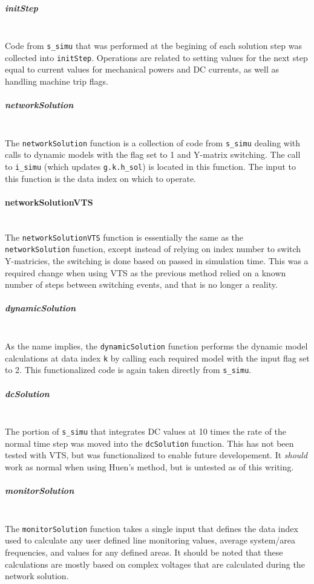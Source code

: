 \documentclass[12pt]{article}
\begin{document}
\subparagraph{initStep} \ \\
Code from \verb|s_simu| that was performed at the begining of each solution step was collected into \verb|initStep|.
Operations are related to setting values for the next step equal to current values for mechanical powers and DC currents, as well as handling machine trip flags.


\subparagraph{networkSolution} \ \\
The \verb|networkSolution| function is a collection of code from \verb|s_simu| dealing with calls to dynamic models with the flag set to 1 and Y-matrix switching.
The call to \verb|i_simu| (which updates \verb|g.k.h_sol|) is located in this function.
The input to this function is the data index on which to operate.

\paragraph{networkSolutionVTS} \ \\
The \verb|networkSolutionVTS| function is essentially the same as the \verb|networkSolution| function, except instead of relying on index number to switch Y-matricies, the switching is done based on passed in simulation time.
This was a required change when using VTS as the previous method relied on a known number of steps between switching events, and that is no longer a reality.


\subparagraph{dynamicSolution} \ \\
As the name implies, the \verb|dynamicSolution| function performs the dynamic model calculations at data index \verb|k| by calling each required model with the input flag set to 2.
This functionalized code is again taken directly from \verb|s_simu|.


\subparagraph{dcSolution} \ \\
The portion of \verb|s_simu| that integrates DC values at 10 times the rate of the normal time step was moved into the \verb|dcSolution| function.
This has not been tested with VTS, but was functionalized to enable future developement.
It \emph{should} work as normal when using Huen's method, but is untested as of this writing.

\pagebreak
\subparagraph{monitorSolution} \ \\
The \verb|monitorSolution| function takes a single input that defines the data index used to calculate any user defined line monitoring values, average system/area frequencies, and values for any defined areas.
It should be noted that these calculations are mostly based on complex voltages that are calculated during the network solution.
\end{document}
